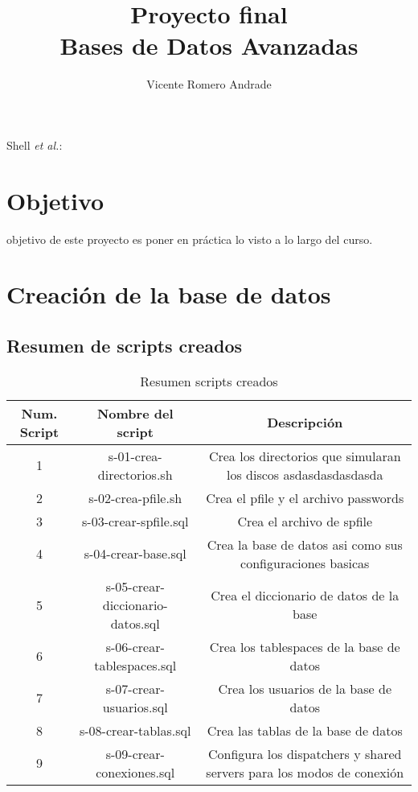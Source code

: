 \documentclass[journal]{IEEEtran}
\begin{document}
\onecolumn
\title{Proyecto final \\ Bases de Datos Avanzadas}
%
\author{Vicente Romero Andrade}

%
{Shell \MakeLowercase{\textit{et al.}}: }

\maketitle



\section{Objetivo}

 objetivo de este proyecto es poner en práctica lo visto a lo largo 
del curso.

\section{Creación de la base de datos}
\subsection{Resumen de scripts creados}
\begin{table}[H]
  \centering
  \begin{longtable}{|c | c | c|} 
   \hline
   Num. Script & Nombre del script & Descripción \\ [0.5ex] 
   \hline
   1 & s-01-crea-directorios.sh & Crea los directorios que simularan los discos asdasdasdasdasda\\ 
   \hline
   2 & s-02-crea-pfile.sh & Crea el pfile y el archivo passwords \\
   \hline
   3 & s-03-crear-spfile.sql & Crea el archivo de spfile  \\
   \hline
   4 & s-04-crear-base.sql & Crea la base de datos asi como sus configuraciones basicas \\
   \hline
   5 & s-05-crear-diccionario-datos.sql & Crea el diccionario de datos de la base \\
   \hline
   6 & s-06-crear-tablespaces.sql & Crea los tablespaces de la base de datos \\
   \hline
   7 & s-07-crear-usuarios.sql & Crea los usuarios de la base de datos \\
   \hline
   8 & s-08-crear-tablas.sql & Crea las tablas de la base de datos \\
   \hline
   9 & s-09-crear-conexiones.sql & Configura los dispatchers y shared servers para los modos de conexión \\
   \hline
  \end{longtable}
  \caption{Resumen scripts creados}
  \label{tabla:1}
\end{table}
\end{document}
